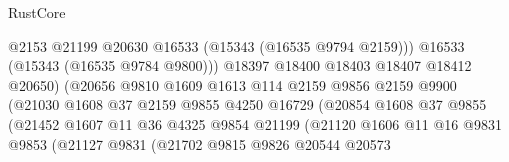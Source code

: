 \begin{lexlean}{RustCore}
\begin{coremodule}
                                          @2153
                                          @21199
                                          @20630
                                          @16533
                                          (@15343 (@16535 @9794 @2159)))
                                        @16533
                                        (@15343 (@16535 @9784 @9800)))
                                      @18397
                                      @18400
                                      @18403
                                      @18407
                                      @18412
                                      @20650)
                                    (@20656
                                      @9810
                                      @1609
                                      @1613
                                      @114
                                      @2159
                                      @9856
                                      @2159
                                      @9900
                                      (@21030
                                        @1608
                                        @37
                                        @2159
                                        @9855
                                        @4250
                                        @16729
                                        (@20854
                                          @1608
                                          @37
                                          @9855
                                          (@21452
                                            @1607
                                            @11
                                            @36
                                            @4325
                                            @9854
                                            @21199
                                            (@21120
                                              @1606
                                              @11
                                              @16
                                              @9831
                                              @9853
                                              (@21127
                                                @9831
                                                (@21702
                                                  @9815
                                                  @9826
                                                  @20544
                                                  @20573

\end{coremodule}
\end{lexlean}
